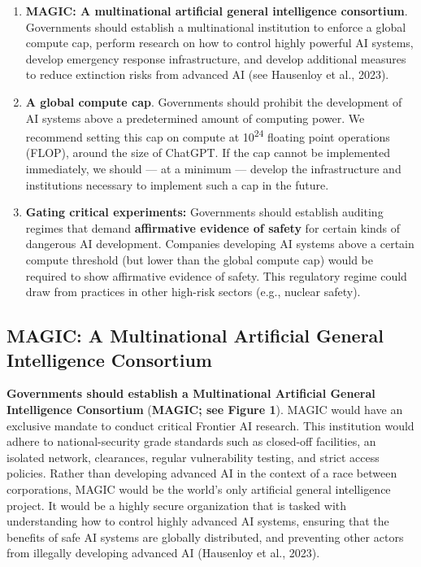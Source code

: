 \documentclass[12pt,a4paper]{article}
\begin{document}
\begin{enumerate}
    \item \textbf{MAGIC: A multinational artificial general intelligence consortium}. Governments should establish a multinational institution to enforce a global compute cap, perform research on how to control highly powerful AI systems, develop emergency response infrastructure, and develop additional measures to reduce extinction risks from advanced AI (see Hausenloy et al., 2023). 
    \item \textbf{A global compute cap}. Governments should prohibit the development of AI systems above a predetermined amount of computing power. We recommend setting this cap on compute at 10\textsuperscript{24} floating point operations (FLOP), around the size of ChatGPT. If the cap cannot be implemented immediately, we should — at a minimum — develop the infrastructure and institutions necessary to implement such a cap in the future.
    \item \textbf{Gating critical experiments: }Governments should establish auditing regimes that demand \textbf{affirmative evidence of safety }for certain kinds of dangerous AI development. Companies developing AI systems above a certain compute threshold (but lower than the global compute cap) would be required to show affirmative evidence of safety. This regulatory regime could draw from practices in other high-risk sectors (e.g., nuclear safety). 
\end{enumerate}

\subsection{MAGIC: A Multinational Artificial General Intelligence Consortium}

\textbf{Governments should establish a Multinational Artificial General Intelligence Consortium }(\textbf{MAGIC; see Figure 1}). MAGIC would have an exclusive mandate to conduct critical Frontier AI research. This institution would adhere to national-security grade standards such as closed-off facilities, an isolated network, clearances, regular vulnerability testing, and strict access policies. Rather than developing advanced AI in the context of a race between corporations, MAGIC would be the world’s only artificial general intelligence project. It would be a highly secure organization that is tasked with understanding how to control highly advanced AI systems, ensuring that the benefits of safe AI systems are globally distributed, and preventing other actors from illegally developing advanced AI (Hausenloy et al., 2023). 
\end{document}
